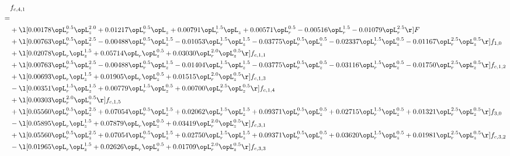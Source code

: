 \begin{alignat}{2} 
\label{eq:f_41_1} 
& f_{c,4,1} \nonumber \\ 
 = \\ 
& + \l[  0.00178 \opL_r^{0.5} \opL_z^{2.0} +  0.01217 \opL_r^{0.5} \opL_z +  0.00791 \opL_r^{1.5} \opL_z +  0.00571 \opL_r^{0.5}   -0.00516 \opL_r^{1.5}   -0.01079 \opL_r^{2.5}  \r] F \nonumber \\ 
& + \l[  0.00763 \opL_r^{0.5} \opL_z^{2.5}   -0.00488 \opL_r^{0.5} \opL_z^{1.5}   -0.01053 \opL_r^{1.5} \opL_z^{1.5}   -0.03775 \opL_r^{0.5} \opL_z^{0.5}   -0.02337 \opL_r^{1.5} \opL_z^{0.5}   -0.01167 \opL_r^{2.5} \opL_z^{0.5}  \r] f_{1,0} \nonumber \\ 
& + \l[  0.02078 \opL_r \opL_z^{1.5} +  0.05714 \opL_r \opL_z^{0.5} +  0.03030 \opL_r^{2.0} \opL_z^{0.5}  \r] f_{c,1,1} \nonumber \\ 
& + \l[  0.00763 \opL_r^{0.5} \opL_z^{2.5}   -0.00488 \opL_r^{0.5} \opL_z^{1.5}   -0.01404 \opL_r^{1.5} \opL_z^{1.5}   -0.03775 \opL_r^{0.5} \opL_z^{0.5}   -0.03116 \opL_r^{1.5} \opL_z^{0.5}   -0.01750 \opL_r^{2.5} \opL_z^{0.5}  \r] f_{c,1,2} \nonumber \\ 
& + \l[  0.00693 \opL_r \opL_z^{1.5} +  0.01905 \opL_r \opL_z^{0.5} +  0.01515 \opL_r^{2.0} \opL_z^{0.5}  \r] f_{c,1,3} \nonumber \\ 
& - \l[  0.00351 \opL_r^{1.5} \opL_z^{1.5} +  0.00779 \opL_r^{1.5} \opL_z^{0.5} +  0.00700 \opL_r^{2.5} \opL_z^{0.5}  \r] f_{c,1,4} \nonumber \\ 
& + \l[  0.00303 \opL_r^{2.0} \opL_z^{0.5}  \r] f_{c,1,5} \nonumber \\ 
& + \l[  0.05560 \opL_r^{0.5} \opL_z^{2.5} +  0.07054 \opL_r^{0.5} \opL_z^{1.5} +  0.02062 \opL_r^{1.5} \opL_z^{1.5} +  0.09371 \opL_r^{0.5} \opL_z^{0.5} +  0.02715 \opL_r^{1.5} \opL_z^{0.5} +  0.01321 \opL_r^{2.5} \opL_z^{0.5}  \r] f_{3,0} \nonumber \\ 
& - \l[  0.05895 \opL_r \opL_z^{1.5} +  0.07879 \opL_r \opL_z^{0.5} +  0.03419 \opL_r^{2.0} \opL_z^{0.5}  \r] f_{c,3,1} \nonumber \\ 
& + \l[  0.05560 \opL_r^{0.5} \opL_z^{2.5} +  0.07054 \opL_r^{0.5} \opL_z^{1.5} +  0.02750 \opL_r^{1.5} \opL_z^{1.5} +  0.09371 \opL_r^{0.5} \opL_z^{0.5} +  0.03620 \opL_r^{1.5} \opL_z^{0.5} +  0.01981 \opL_r^{2.5} \opL_z^{0.5}  \r] f_{c,3,2} \nonumber \\ 
& - \l[  0.01965 \opL_r \opL_z^{1.5} +  0.02626 \opL_r \opL_z^{0.5} +  0.01709 \opL_r^{2.0} \opL_z^{0.5}  \r] f_{c,3,3} \nonumber \\ 

\end{alignat}
